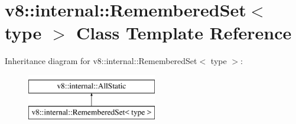 \hypertarget{classv8_1_1internal_1_1RememberedSet}{}\section{v8\+:\+:internal\+:\+:Remembered\+Set$<$ type $>$ Class Template Reference}
\label{classv8_1_1internal_1_1RememberedSet}
Inheritance diagram for v8\+:\+:internal\+:\+:Remembered\+Set$<$ type $>$\+:\begin{figure}[H]
\begin{center}
\leavevmode
\includegraphics[height=2.000000cm]{classv8_1_1internal_1_1RememberedSet}
\end{center}
\end{figure}
